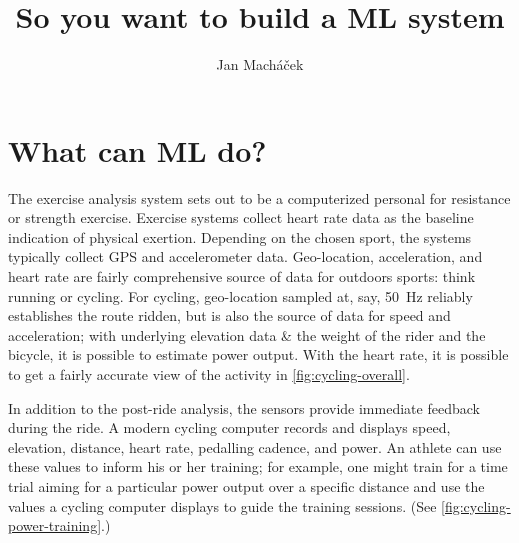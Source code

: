 



\title{So you want to build a ML system}

\author{Jan Macháček}




\section{What can ML do?}
The exercise analysis system sets out to be a computerized personal for resistance or strength exercise. Exercise systems collect heart rate data as the baseline indication of physical exertion. Depending on the chosen sport, the systems typically collect GPS and accelerometer data. Geo-location, acceleration, and heart rate are fairly comprehensive source of data for outdoors sports: think running or cycling. For cycling, geo-location sampled at, say, \SI{50}{\hertz} reliably establishes the route ridden, but is also the source of data for speed and acceleration; with underlying elevation data \& the weight of the rider and the bicycle, it is possible to estimate power output. With the heart rate, it is possible to get a  fairly accurate view of the activity in \autoref{fig:cycling-overall}.


In addition to the post-ride analysis, the sensors provide immediate feedback during the ride. A modern cycling computer records and displays speed, elevation, distance, heart rate, pedalling cadence, and power. An athlete can use these values to inform his or her training; for example, one might train for a time trial aiming for a particular power output over a specific distance and use the values a cycling computer displays to guide the training sessions. (See \autoref{fig:cycling-power-training}.)

